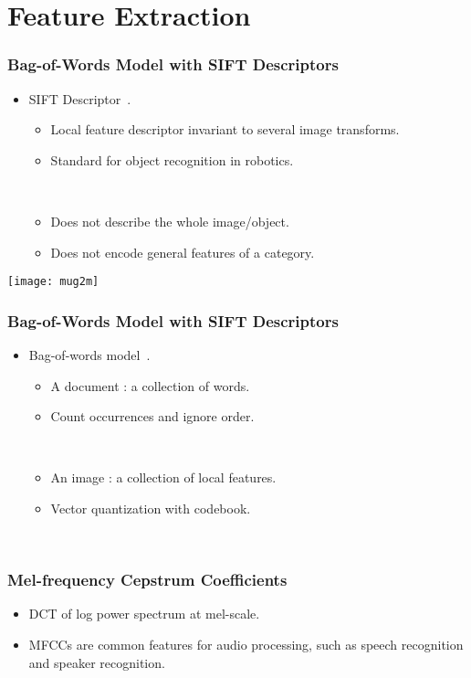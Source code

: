 \documentclass{beamer}
\begin{document}
\section{Feature Extraction}
\begin{frame}
  \frametitle{Bag-of-Words Model with SIFT Descriptors}

  \begin{itemize}
    \item SIFT Descriptor~\cite{lowe_object_1999}. 
      \begin{itemize}
        \item Local feature descriptor invariant to several image transforms.
        \item Standard for object recognition in robotics.

          ~
        \item Does not describe the whole image/object.
        \item Does not encode general features of a category.
      \end{itemize}
  \end{itemize}

  \centering
  \texttt{[image: mug2m]}
\end{frame}

\begin{frame}
  \frametitle{Bag-of-Words Model with SIFT Descriptors}

  \begin{itemize}
    \item Bag-of-words model~\cite{csurka_visual_2004}. 
      \begin{itemize}
        \item A document : a collection of words.
        \item Count occurrences and ignore order. 

          ~
        \item An image : a collection of local features.
        \item Vector quantization with codebook.
      \end{itemize}
      ~
  \end{itemize}
\end{frame}

\begin{frame}
  \frametitle{Mel-frequency Cepstrum Coefficients}

  \begin{itemize}
    \item DCT of log power spectrum at mel-scale.
    \item MFCCs are common features for audio processing, such as speech recognition and speaker recognition.
  \end{itemize}
\end{frame}
\end{document}

